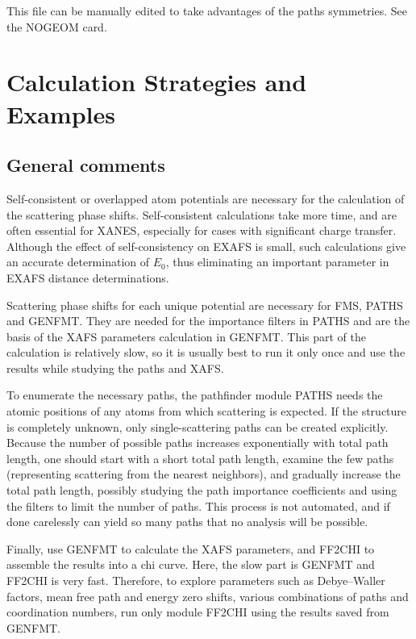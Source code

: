 \documentclass[11pt,oneside]{report} %
\begin{document}
This file can be manually edited to take advantages of the paths
symmetries. See the NOGEOM card.




\chapter{Calculation Strategies and Examples}
\label{sec:Calc-Strat-Exampl}





\section{General comments}
\label{sec:EXAFS-Calculations}


Self-consistent or overlapped atom potentials are necessary
for the calculation of the scattering phase shifts. Self-consistent
calculations take more time, and are often essential for XANES,
especially for cases with significant charge transfer.
Although the effect of self-consistency on EXAFS is small,
such calculations give an accurate determination of $E_0$,
thus eliminating an important parameter in EXAFS
distance determinations.

Scattering phase shifts for each unique potential are necessary for
FMS, PATHS and GENFMT.  They are needed for the importance filters in
PATHS and are the basis of the XAFS parameters calculation in GENFMT.
This part of the calculation is relatively slow, so it is usually best to run
it only once and use the results while studying the paths and XAFS.

To enumerate the necessary paths, the pathfinder module PATHS needs the
atomic positions of any atoms from which scattering is expected.  If
the structure is completely unknown, only single-scattering paths can be
created explicitly.  Because the number of possible paths increases
exponentially with total path length, one should start with a short total path
length, examine the few paths (representing scattering from the nearest
neighbors), and gradually increase the total path length, possibly
studying the path importance coefficients and using the filters to
limit the number of paths.  This process is not automated, and if done
carelessly can yield so many paths that no analysis will be possible.

Finally, use GENFMT to calculate the XAFS parameters, and FF2CHI to
assemble the results into a chi curve.  Here, the slow part is GENFMT
and FF2CHI is very fast.  Therefore, to explore parameters such as
Debye--Waller factors, mean free path and energy zero shifts, various
combinations of paths and coordination numbers, run only module FF2CHI
using the results saved from GENFMT.
\end{document}
